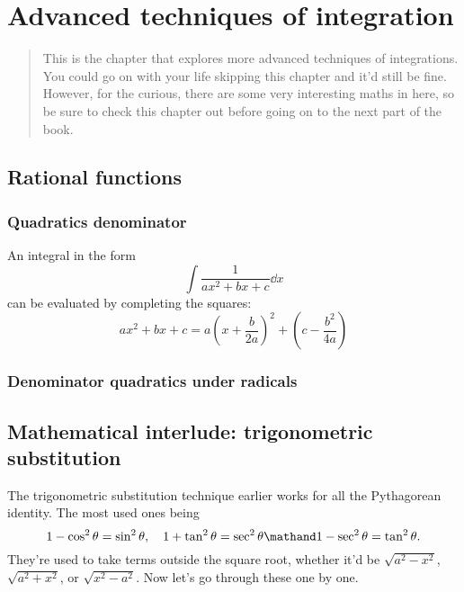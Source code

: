 \chapter{Advanced techniques of integration}
\label{sec:advancedtechniquesofintegration}

\begin{abstract}
    This is the chapter that explores more advanced techniques of integrations. You could go on with your life skipping this chapter and it'd still be fine. However, for the curious, there are some very interesting maths in here, so be sure to check this chapter out before going on to the next part of the book.
\end{abstract}

\section{Rational functions}
\label{eq:advtechniquesrationalfunctions}

\subsection{Quadratics denominator}

An integral in the form
\begin{equation}
    \int \frac{1}{ax^2 + bx + c}\dd{x}
\end{equation}
can be evaluated by completing the squares:
\begin{equation}
    ax^2 + bx + c = a\left(x + \frac{b}{2a}\right)^2 + \left(c - \frac{b^2}{4a}\right)
\end{equation}

\subsection{Denominator quadratics under radicals}

\section{Mathematical interlude: trigonometric substitution}

The trigonometric substitution technique earlier works for all the Pythagorean identity. The most used ones being
\begin{equation*}
	1 - \cos^2\theta = \sin^2\theta, \quad 1 + \tan^2\theta = \sec^2\theta \mathand 1 - \sec^2\theta = \tan^2\theta.
\end{equation*}
They're used to take terms outside the square root, whether it'd be $\sqrt{a^2 - x^2}$, $\sqrt{a^2 + x^2}$, or $\sqrt{x^2 - a^2}$. Now let's go through these one by one.

